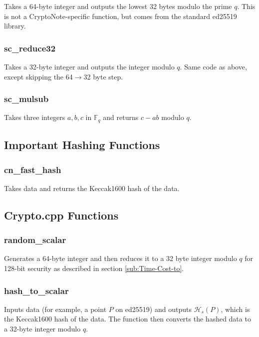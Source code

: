 \documentclass[12pt,english]{mrl}
\numberwithin{equation}{section}
\numberwithin{figure}{section}
\begin{document}
Takes a 64-byte integer and outputs the lowest 32 bytes modulo the
prime $q$. This is not a CryptoNote-specific function, but comes
from the standard ed25519 library. 


\subsubsection{sc\_reduce32}

Takes a 32-byte integer and outputs the integer modulo $q$. Same
code as above, except skipping the 64$\to$32 byte step. 


\subsubsection{sc\_mulsub}

Takes three integers $a,b,c$ in $\mathbb{F}_{q}$ and returns $c-ab$
modulo $q$. 


\subsection{Important Hashing Functions}


\subsubsection{cn\_fast\_hash}

Takes data and returns the Keccak1600 hash of the data. 


\subsection{Crypto.cpp Functions }


\subsubsection{random\_scalar}

Generates a 64-byte integer and then reduces it to a 32 byte integer
modulo $q$ for 128-bit security as described in section \ref{sub:Time-Cost-to}. 


\subsubsection{hash\_to\_scalar}

Inputs data (for example, a point $P$ on ed25519) and outputs $\mathcal{H}_{s}\left(P\right)$,
which is the Keccak1600 hash of the data. The function then converts
the hashed data to a 32-byte integer modulo $q$. 
\end{document}
